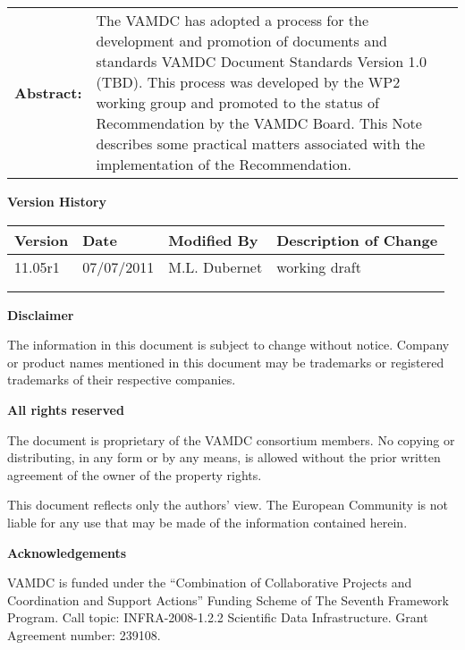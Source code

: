 {\begin{titlepage}
\begin{tabular}{p{1.7in}p{4.3in}}
\textbf{Abstract:} & 
The VAMDC has adopted a process for the development and promotion of documents and standards  
VAMDC Document Standards Version 1.0 (TBD).  This process was developed by the WP2 working group 
and promoted to the status of Recommendation by the VAMDC Board.  
This Note describes some practical matters associated with the implementation of the 
Recommendation.
\end{tabular}



\end{titlepage}

\noindent \textbf{Version History}

\textbf{}

\noindent \begin{tabular}{|l|l|l|l|} 
\hline 
\textbf{Version} & \textbf{Date} & \textbf{Modified By} & \textbf{Description of Change} \\ \hline 
11.05r1 & 07/07/2011 & M.L. Dubernet & working draft \\ \hline 
 &  &  &  \\ \hline 
 &  &  &  \\ \hline 
\end{tabular}

\textbf{}

\noindent \textbf{Disclaimer}

\noindent The information in this document is subject to change without notice. Company or product names mentioned in this document may be trademarks or registered trademarks of their respective companies.


\textbf{}

\noindent \textbf{All rights reserved}

\noindent The document is proprietary of the VAMDC consortium members. No copying or distributing, in any form or by any means, is allowed without the prior written agreement of the owner of the property rights.

\noindent 

\noindent This document reflects only the authors' view. The European Community is not liable for any use that may be made of the information contained herein.

\textbf{}

\noindent \textbf{Acknowledgements}

\noindent VAMDC is funded under the ``Combination of Collaborative Projects and Coordination and  Support Actions'' Funding Scheme of The Seventh Framework Program. Call topic: INFRA-2008-1.2.2 Scientific Data Infrastructure. Grant Agreement number: 239108.

\textbf{}

}